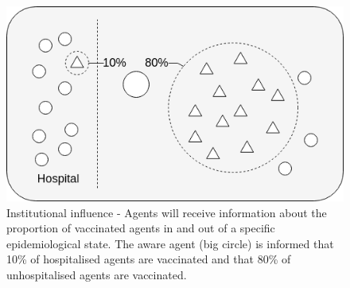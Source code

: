 \clearpage

\begin{figure}[!htb]
    \centering
        \includegraphics[width=\linewidth]{pics/institutional.drawio.png}
    \endminipage
    \caption{Institutional influence - Agents will receive information about the proportion of vaccinated agents in and out of a specific epidemiological state. The aware agent (big circle) is informed that 10\% of hospitalised agents are vaccinated and that 80\% of unhospitalised agents are vaccinated.}
    \label{fig:institutional_influence}
\end{figure}

